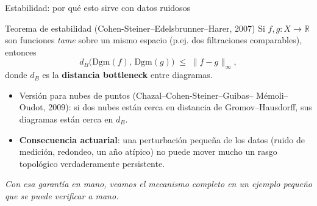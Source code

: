 \documentclass[aspectratio=169,11pt]{beamer}
\newcommand{\defterm}[1]{\textbf{\color{accent}#1}}
\begin{document}
\begin{frame}{Estabilidad: por qué esto sirve con datos ruidosos}
  \small
  \begin{block}{Teorema de estabilidad (Cohen-Steiner--Edelsbrunner--Harer, 2007)}
    Si $f,g:X\to\mathbb{R}$ son funciones \emph{tame} sobre un mismo espacio
    (p.ej. dos filtraciones comparables), entonces
    \[
      d_B\big(\mathrm{Dgm}(f),\,\mathrm{Dgm}(g)\big) \;\le\; \|f-g\|_\infty,
    \]
    donde $d_B$ es la \defterm{distancia bottleneck} entre diagramas.
  \end{block}
  \begin{itemize}
    \setlength{\itemsep}{0.2em}
    \item Versión para nubes de puntos (Chazal--Cohen-Steiner--Guibas--%
      Mémoli--Oudot, 2009): si dos nubes están cerca en distancia de
      Gromov--Hausdorff, sus diagramas están cerca en $d_B$.
    \item \textbf{Consecuencia actuarial}: una perturbación pequeña de los
      datos (ruido de medición, redondeo, un año atípico) no puede mover
      mucho un rasgo topológico verdaderamente persistente.
  \end{itemize}
  \vspace{0.4em}
  {\itshape\color{muted}
  Con esa garantía en mano, veamos el mecanismo completo en un ejemplo
  pequeño que se puede verificar a mano.}
\end{frame}

\end{document}
